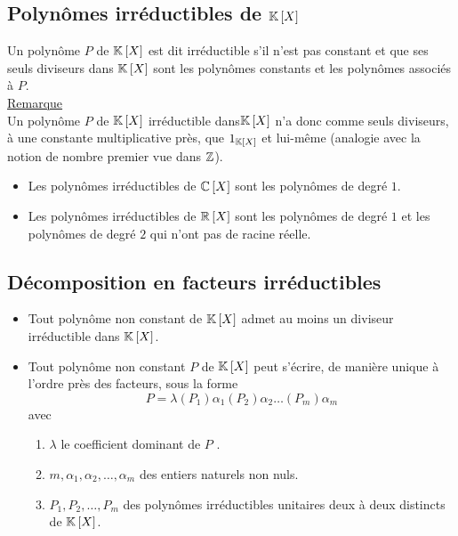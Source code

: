 \subsection{Polynômes irréductibles de \(\mathbb{K}\left[X\right]\)}
\begin{defi}
    Un polynôme \(P\) de \(\mathbb{K}\left[X\right]\) est dit irréductible s’il n’est pas constant et que ses seuls diviseurs dans \(\mathbb{K}\left[X\right]\) sont les polynômes constants et les polynômes associés à \(P\). \\
    \underline{Remarque} \\
    Un polynôme \(P\) de \( \mathbb{K}\left[X\right]\) irréductible dans\( \mathbb{K}\left[X\right]\) n’a donc comme seuls diviseurs, à une constante multiplicative près, que \(1_{\mathbb{K}\left[X\right]}\) et lui-même (analogie avec la notion de nombre premier vue dans \(\mathbb{Z}\)).
\end{defi}
\begin{defprop}
    \begin{itemize}
        \item Les polynômes irréductibles de \(\mathbb{C} \left[X\right]\) sont les polynômes de degré \(1\).
        \item Les polynômes irréductibles de \(\mathbb{R} \left[X\right]\) sont les polynômes de degré \(1\) et les polynômes de degré \(2\) qui n’ont pas de racine réelle.
    \end{itemize}
\end{defprop}

\subsection{Décomposition en facteurs irréductibles}
\begin{theo}
    \begin{itemize}
        \item Tout polynôme non constant de \(\mathbb{K}\left[X\right]\) admet au moins un diviseur irréductible dans \(\mathbb{K}\left[X\right]\).
        \item Tout polynôme non constant \(P\) de \(\mathbb{K}\left[X\right]\) peut s’écrire, de manière unique à l’ordre près des facteurs, sous la forme \[P = \lambda  (P_1)\alpha_1 (P_2)\alpha_2 \dots (P_m)\alpha_m\]
        avec
        \begin{enumerate}
            \item  \(\lambda\)  le coefficient dominant de \(P\) .
            \item \(m, \alpha_1, \alpha_2, \dots , \alpha_m\) des entiers naturels non nuls.
            \item \(P_1, P_2, \dots , P_m\) des polynômes irréductibles unitaires deux à deux distincts de \(\mathbb{K}\left[X\right]\).
        \end{enumerate}
    \end{itemize}
\end{theo}

